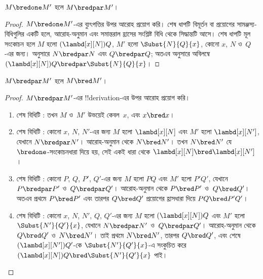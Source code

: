 \documentclass[../../../include/open-logic-section]{subfiles}
\begin{document}


\begin{lem}
  $M \bredone M'$ হলে $M \bredpar M'$।
\end{lem}
\begin{proof} $M \bredone M'$-এর ব্যুৎপত্তির উপর আরোহ প্রয়োগ
  করি। শেষ ধাপটি বিমূর্তন বা প্রয়োগের সামঞ্জস্য-বিধিগুলির একটি হলে,
  আরোহ-অনুমান এবং সমান্তরাল হ্রাসের সংশ্লিষ্ট বিধি থেকে সিদ্ধান্তটি আসে।
  শেষ ধাপটি মূল সংকোচন হলে $M$ হলো
  $(\lambd[x][N])Q$, $M'$ হলো $\Subst{N}{Q}{x}$, কোনো
  $x$, $N$ ও~$Q$-এর জন্য।  অনুসারে
  $N \bredpar N$ এবং $Q \bredpar Q$; অতএব
   অনুসারে অবিলম্বে
  $(\lambd[x][N])Q \bredpar \Subst{N}{Q}{x}$।
\end{proof}

\begin{lem}
  $M \bredpar M'$ হলে $M \bred M'$।
\end{lem}

\begin{proof} $M \bredpar M'$-এর !!{derivation}-এর উপর আরোহ প্রয়োগ
  করি।
  \begin{enumerate}
  \item শেষ বিধিটি : তখন $M$ ও~$M'$ উভয়েই
    কেবল~$x$, এবং $x \bred x$।
  \item শেষ বিধিটি : কোনো $x$, $N$, $N'$-এর
    জন্য $M$ হলো $\lambd[x][N]$ এবং $M'$ হলো $\lambd[x][N']$, যেখানে
    $N \bredpar N'$। আরোহ-অনুমান থেকে $N \bred N'$। তখন $N \bred N'$
    যে $\bredone$-সংকোচনধারা দিয়ে হয়, সেই একই ধারা থেকে
    $\lambd[x][N] \bred \lambd[x][N']$।
  \item শেষ বিধিটি : কোনো $P$, $Q$, $P'$,
    $Q'$-এর জন্য $M$ হলো $PQ$ এবং $M'$ হলো $P'Q'$, যেখানে
    $P \bredpar P'$ ও~$Q \bredpar Q'$। আরোহ-অনুমান থেকে
    $P \bred P'$ ও~$Q \bred Q'$। অতএব প্রথমে $P \bred P'$ এবং তারপর
    $Q \bred Q'$ প্রয়োগের হ্রাসধারা দিয়ে $PQ \bred P'Q'$।
  \item শেষ বিধিটি : কোনো $x$, $N$, $N'$,
    $Q$, $Q'$-এর জন্য $M$ হলো $(\lambd[x][N])Q$ এবং $M'$ হলো
    $\Subst{N'}{Q'}{x}$, যেখানে $N \bredpar N'$ ও~$Q \bredpar Q'$।
    আরোহ-অনুমান থেকে $Q \bred Q'$ ও~$N \bred N'$। তাই প্রথমে
    $N \bred N'$, তারপর $Q \bred Q'$, এবং শেষে
    $(\lambd[x][N'])Q'$-কে $\Subst{N'}{Q'}{x}$-এ সংকুচিত করে
    $(\lambd[x][N])Q \bred \Subst{N'}{Q'}{x}$ পাই।
  \end{enumerate}
\end{proof}
\end{document}
